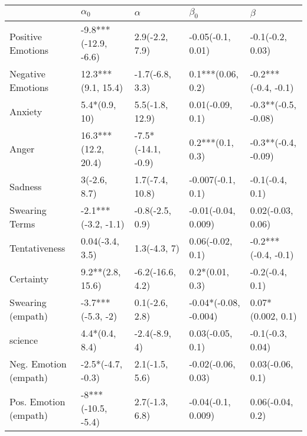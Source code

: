 \begin{tabular}{lllll}
\toprule
{} &            $\alpha_0$ &            $\alpha$ &              $\beta_0$ &              $\beta$ \\
\midrule
Positive Emotions     &  -9.8***(-12.9, -6.6) &      2.9(-2.2, 7.9) &      -0.05(-0.1, 0.01) &     -0.1(-0.2, 0.03) \\
Negative Emotions     &    12.3***(9.1, 15.4) &     -1.7(-6.8, 3.3) &      0.1***(0.06, 0.2) &  -0.2***(-0.4, -0.1) \\
Anxiety               &         5.4*(0.9, 10) &     5.5(-1.8, 12.9) &       0.01(-0.09, 0.1) &  -0.3**(-0.5, -0.08) \\
Anger                 &   16.3***(12.2, 20.4) &  -7.5*(-14.1, -0.9) &       0.2***(0.1, 0.3) &  -0.3**(-0.4, -0.09) \\
Sadness               &          3(-2.6, 8.7) &     1.7(-7.4, 10.8) &      -0.007(-0.1, 0.1) &      -0.1(-0.4, 0.1) \\
Swearing Terms        &   -2.1***(-3.2, -1.1) &     -0.8(-2.5, 0.9) &    -0.01(-0.04, 0.009) &    0.02(-0.03, 0.06) \\
Tentativeness         &       0.04(-3.4, 3.5) &        1.3(-4.3, 7) &       0.06(-0.02, 0.1) &  -0.2***(-0.4, -0.1) \\
Certainty             &      9.2**(2.8, 15.6) &    -6.2(-16.6, 4.2) &        0.2*(0.01, 0.3) &      -0.2(-0.4, 0.1) \\
Swearing (empath)     &     -3.7***(-5.3, -2) &      0.1(-2.6, 2.8) &  -0.04*(-0.08, -0.004) &    0.07*(0.002, 0.1) \\
science               &        4.4*(0.4, 8.4) &       -2.4(-8.9, 4) &       0.03(-0.05, 0.1) &     -0.1(-0.3, 0.04) \\
Neg. Emotion (empath) &     -2.5*(-4.7, -0.3) &      2.1(-1.5, 5.6) &     -0.02(-0.06, 0.03) &     0.03(-0.06, 0.1) \\
Pos. Emotion (empath) &    -8***(-10.5, -5.4) &      2.7(-1.3, 6.8) &     -0.04(-0.1, 0.009) &     0.06(-0.04, 0.2) \\
\bottomrule
\end{tabular}
